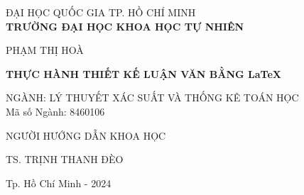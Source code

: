 \newpage
\thispagestyle{empty}
\begin{center}
\fontsize{13}{16}\selectfont
{ĐẠI HỌC QUỐC GIA TP. HỒ CHÍ MINH}\\
{\bf TRƯỜNG ĐẠI HỌC KHOA HỌC TỰ NHIÊN}

\vspace*{1.5cm}
\fontsize{14}{16}\selectfont
{PHẠM THỊ HOÀ}

\vspace*{1.5cm}
\fontsize{16}{16}\selectfont
{\bf THỰC HÀNH THIẾT KẾ LUẬN VĂN BẰNG \LaTeX}

\vspace*{1.5cm}
\fontsize{13}{16}\selectfont
NGÀNH: LÝ THUYẾT XÁC SUẤT VÀ THỐNG KÊ TOÁN HỌC\\[10pt]
Mã số Ngành: 8460106

\vspace*{3cm}

NGƯỜI HƯỚNG DẪN KHOA HỌC

{TS. TRỊNH THANH ĐÈO}

\vfill
\fontsize{13}{16}\selectfont
{Tp. Hồ Chí Minh - 2024}
\end{center}

